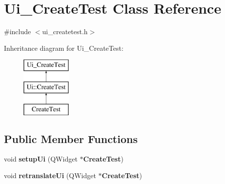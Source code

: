 \section{Ui\-\_\-\-Create\-Test Class Reference}
\label{class_ui___create_test}


{\ttfamily \#include $<$ui\-\_\-createtest.\-h$>$}

Inheritance diagram for Ui\-\_\-\-Create\-Test\-:\begin{figure}[H]
\begin{center}
\leavevmode
\includegraphics[height=3.000000cm]{class_ui___create_test}
\end{center}
\end{figure}
\subsection*{Public Member Functions}
\begin{DoxyCompactItemize}
\item 
void {\bf setup\-Ui} (Q\-Widget $\ast${\bf Create\-Test})
\item 
void {\bf retranslate\-Ui} (Q\-Widget $\ast${\bf Create\-Test})
\end{DoxyCompactItemize}
